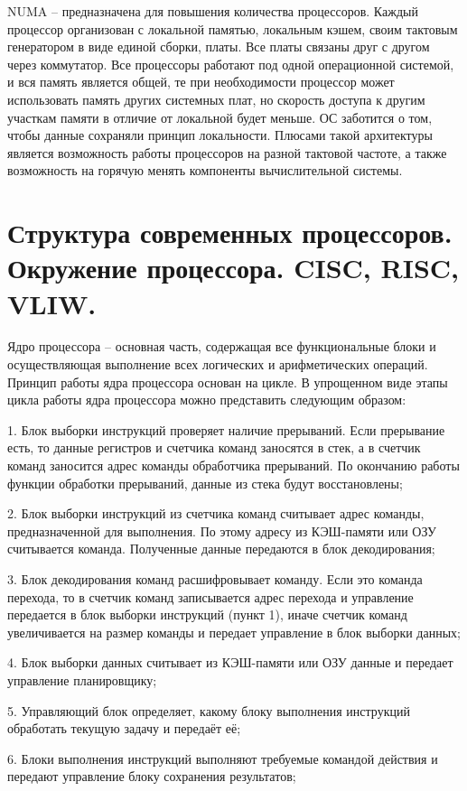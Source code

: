 \documentclass{article}
\begin{document}
NUMA – предназначена для повышения количества процессоров. Каждый процессор организован с локальной памятью, локальным кэшем, своим тактовым генератором в виде единой сборки, платы. 
Все платы связаны друг с другом через коммутатор. Все процессоры работают под одной операционной системой, и вся память является общей, те при необходимости процессор может использовать память других системных плат, 
но скорость доступа к другим участкам памяти в отличие от локальной будет меньше. ОС заботится о том, чтобы данные сохраняли принцип локальности. 
Плюсами такой архитектуры является возможность работы процессоров на разной тактовой частоте, а также возможность на горячую менять компоненты вычислительной системы. 

\section{Структура современных процессоров. Окружение процессора. CISC, RISC, VLIW.}
Ядро процессора – основная часть, содержащая все функциональные блоки и осуществляющая выполнение всех логических и арифметических операций.
Принцип работы ядра процессора основан на цикле. В упрощенном виде этапы цикла работы ядра процессора можно представить следующим образом:

1. Блок выборки инструкций проверяет наличие прерываний. Если прерывание есть, то данные регистров и счетчика команд заносятся в стек, а в счетчик команд заносится адрес команды обработчика прерываний. 
По окончанию работы функции обработки прерываний, данные из стека будут восстановлены;

2. Блок выборки инструкций из счетчика команд считывает адрес команды, предназначенной для выполнения. По этому адресу из КЭШ-памяти или ОЗУ считывается команда. 
Полученные данные передаются в блок декодирования;

3. Блок декодирования команд расшифровывает команду. 
Если это команда перехода, то в счетчик команд записывается адрес перехода и управление передается в блок выборки инструкций (пункт 1), 
иначе счетчик команд увеличивается на размер команды и передает управление в блок выборки данных;

4. Блок выборки данных считывает из КЭШ-памяти или ОЗУ данные и передает управление планировщику;

5. Управляющий блок определяет, какому блоку выполнения инструкций обработать текущую задачу и передаёт её;

6. Блоки выполнения инструкций выполняют требуемые командой действия и передают управление блоку сохранения результатов;
\end{document}
